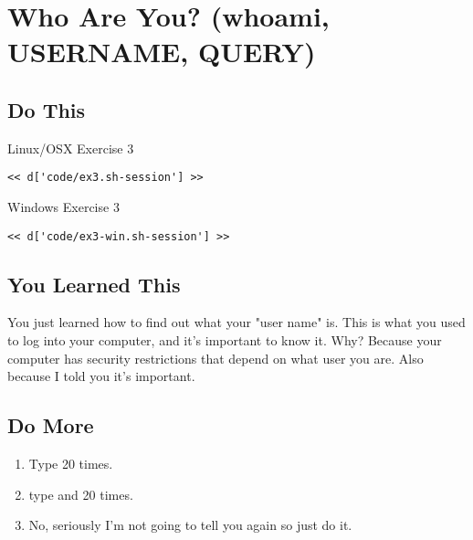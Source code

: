 \chapter{Who Are You? (whoami, USERNAME, QUERY)}

\section{Do This}

\begin{code}{Linux/OSX Exercise 3}
\begin{Verbatim}
<< d['code/ex3.sh-session'] >>
\end{Verbatim}
\end{code}

\begin{code}{Windows Exercise 3}
\begin{Verbatim}
<< d['code/ex3-win.sh-session'] >>
\end{Verbatim}
\end{code}

\section{You Learned This}

You just learned how to find out what your "user name" is.  This is what
you used to log into your computer, and it's important to know it.  Why?
Because your computer has security restrictions that depend on what user
you are.  Also because I told you it's important.

\section{Do More}

\begin{enumerate}
\item Type  20 times.
\item type  and  20 times.
\item No, seriously I'm not going to tell you again so just do it.
\end{enumerate}

